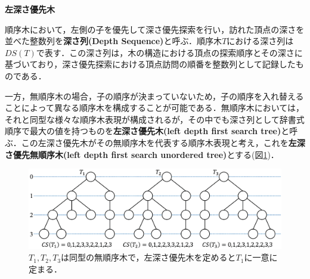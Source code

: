 \begin{define}{\bf 左深さ優先木}\par
  順序木において，左側の子を優先して深さ優先探索を行い，訪れた頂点の深さを並べた整数列を\textbf{深さ列(Depth Sequence)}と呼ぶ．順序木$T$における深さ列は$DS(T)$で表す．この深さ列は，木の構造における頂点の探索順序とその深さに基づいており，深さ優先探索における頂点訪問の順番を整数列として記録したものである．

  一方，無順序木の場合，子の順序が決まっていないため，子の順序を入れ替えることによって異なる順序木を構成することが可能である．無順序木においては，それと同型な様々な順序木表現が構成されるが，その中でも深さ列として辞書式順序で最大の値を持つものを\textbf{左深さ優先木(left depth first search tree)}と呼ぶ．この左深さ優先木がその無順序木を代表する順序木表現と考え，これを\textbf{左深さ優先無順序木(left depth first search unordered tree)}とする(図\ref{fig:left_dfs})．%
\end{define}

\begin{figure}[tb]
  \centering
  \includegraphics[scale=0.5]{fig/fig-left_dfs.eps}
  \caption{$T_1,T_2,T_3$は同型の無順序木で，左深さ優先木を定めると$T_1$に一意に定まる．}\label{fig:left_dfs}
\end{figure}

%


